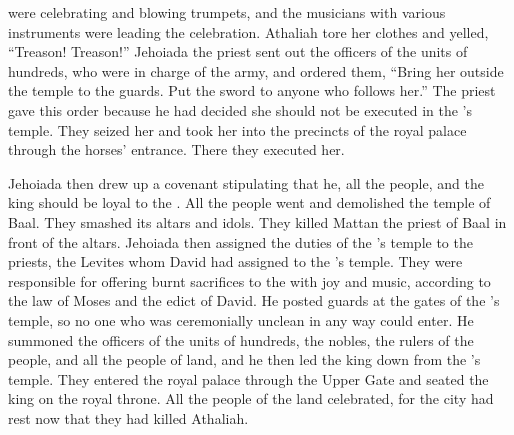 {were celebrating
and blowing
trumpets,
and the musicians
with various
instruments
were leading
the celebration.
Athaliah
tore
her clothes
and yelled,
“Treason! Treason!”
Jehoiada
the priest
sent out the officers
of the units of hundreds,
who
were in charge of the army,
and ordered
them,
“Bring
her outside
the temple
to
the guards.
Put
the sword
to anyone who follows her.” The priest
gave this order because
he had decided she should not
be executed
in the
{}’s
temple.
They seized
her and took
her into
the precincts
of the royal
palace
through the horses’
entrance.
There
they executed her.
\par }{\PP {}Jehoiada
then drew up
a covenant
stipulating that he, all
the people,
and the king
should be
loyal to the
{}.
All
the people
went
and demolished
the temple
of Baal.
They smashed
its altars
and idols.
They killed
Mattan
the priest
of Baal
in front
of the altars.
Jehoiada
then assigned
the duties
of the
{}’s
temple
to the priests,
the Levites
whom
David
had assigned
to the
{}’s
temple.
They were responsible for offering
burnt sacrifices
to the
{}
with joy
and music,
according to the law
of Moses
and the edict
of David.
He posted
guards
at the gates
of the
{}’s
temple,
so no
one who was ceremonially unclean
in any
way could
enter.
He summoned
the officers
of the units of hundreds,
the nobles,
the rulers
of the people,
and all
the people
of land,
and he then led the king
down
from the
{}’s
temple.
They entered
the royal
palace
through
the Upper
Gate
and seated
the king
on
the royal
throne.
All
the people
of the land
celebrated,
for the city
had rest
now that they had killed
Athaliah.

}
